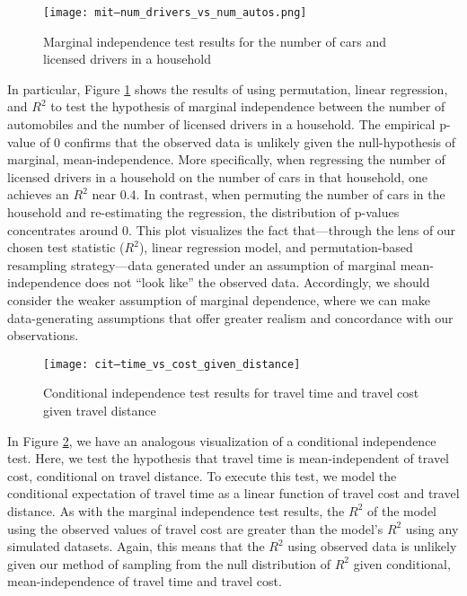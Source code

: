 \begin{figure}
   \centering
   \texttt{[image: mit--num\_drivers\_vs\_num\_autos.png]}
   \caption{Marginal independence test results for the number of cars and licensed drivers in a household}
   \label{fig:marginal-independence-test}
\end{figure}

In particular, Figure \ref{fig:marginal-independence-test} shows the results of using permutation, linear regression, and $R^2$ to test the hypothesis of marginal independence between the number of automobiles and the number of licensed drivers in a household.
The empirical p-value of 0 confirms that the observed data is unlikely given the null-hypothesis of marginal, mean-independence.
More specifically, when regressing the number of licensed drivers in a household on the number of cars in that household, one achieves an $R^2$ near 0.4.
In contrast, when permuting the number of cars in the household and re-estimating the regression, the distribution of p-values concentrates around 0.
This plot visualizes the fact that---through the lens of our chosen test statistic ($R^2$), linear regression model, and permutation-based resampling strategy---data generated under an assumption of marginal mean-independence does not ``look like'' the observed data.
Accordingly, we should consider the weaker assumption of marginal dependence, where we can make data-generating assumptions that offer greater realism and concordance with our observations.

\begin{figure}
   \centering
   \texttt{[image: cit--time\_vs\_cost\_given\_distance]}
   \caption{Conditional independence test results for travel time and travel cost given travel distance}
   \label{fig:conditional-independence-test}
\end{figure}
In Figure \ref{fig:conditional-independence-test}, we have an analogous visualization of a conditional independence test.
Here, we test the hypothesis that travel time is mean-independent of travel cost, conditional on travel distance.
To execute this test, we model the conditional expectation of travel time as a linear function of travel cost and travel distance.
As with the marginal independence test results, the $R^2$ of the model using the observed values of travel cost are greater than the model's $R^2$ using any simulated datasets.
Again, this means that the $R^2$ using observed data is unlikely given our method of sampling from the null distribution of $R^2$ given conditional, mean-independence of travel time and travel cost.

